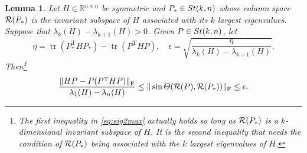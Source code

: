 \documentclass[11pt]{article}
\def\bbR{\mathbb{R}}
\def\cR{{\cal R}}
\newcommand\STM[2]{{\rm St}(#1,#2)}
\DeclareMathOperator{\tr}{tr}
\DeclareMathOperator{\F}{F}
\DeclareMathOperator{\T}{T}
\newtheorem{lemma}{Lemma}[section]
\theoremstyle{definition}
\numberwithin{equation}{section}
\begin{document}
\begin{lemma}\label{lm:maxtrace-proj}
Let $H\in\bbR^{n\times n}$ be symmetric and $P_*\in\STM{k}{n}$ whose column space $\cR(P_*)$ is the invariant subspace
of $H$ associated with its $k$ largest eigenvalues. Suppose that $\lambda_k(H)-\lambda_{k+1}(H)>0$.
Given $P\in\STM{k}{n}$, let
$$
\eta=\tr(P_*^{\T}HP_*)-\tr(P^{\T}HP), \quad \epsilon=\sqrt{\frac {\eta}{\lambda_k(H)-\lambda_{k+1}(H)}}.
$$
Then\footnote {The first inequality in \eqref{eq:eig2max} actually holds so long as
      $\cR(P_*)$ is a $k$-dimensional invariant subspace of $H$. It is the second inequality
      that needs the condition of $\cR(P_*)$ being associated with the $k$ largest eigenvalues of $H$.}
\begin{equation}\label{eq:eig2max}
\frac {\|HP-P(P^{\T}HP)\|_{\F}}{\lambda_1(H)-\lambda_n(H)}\le\|\sin\Theta(\cR(P),\cR(P_*))\|_{\F}\le {\epsilon}.
\end{equation}
\end{lemma}
\end{document}
